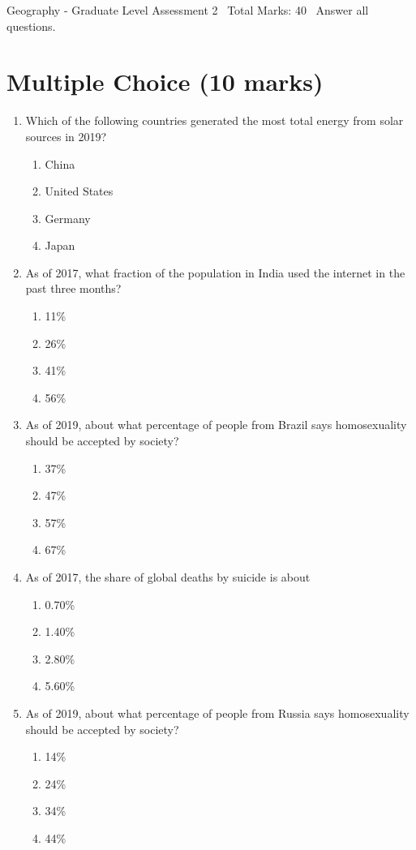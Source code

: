 \documentclass[12pt]{article}
\begin{document}
\begin{center}
Geography - Graduate Level Assessment 2 \
Total Marks: 40 \
Answer all questions.
\end{center}

\section*{Multiple Choice (10 marks)}
\begin{enumerate}[label=\arabic*.]
\item Which of the following countries generated the most total energy from solar sources in 2019?
\begin{enumerate}[label=(\alph*)]
    \item China
    \item United States
    \item Germany
    \item Japan
\end{enumerate}
\item As of 2017, what fraction of the population in India used the internet in the past three months?
\begin{enumerate}[label=(\alph*)]
    \item 11\%
    \item 26\%
    \item 41\%
    \item 56\%
\end{enumerate}
\item As of 2019, about what percentage of people from Brazil says homosexuality should be accepted by society?
\begin{enumerate}[label=(\alph*)]
    \item 37\%
    \item 47\%
    \item 57\%
    \item 67\%
\end{enumerate}
\item As of 2017, the share of global deaths by suicide is about
\begin{enumerate}[label=(\alph*)]
    \item 0.70\%
    \item 1.40\%
    \item 2.80\%
    \item 5.60\%
\end{enumerate}
\item As of 2019, about what percentage of people from Russia says homosexuality should be accepted by society?
\begin{enumerate}[label=(\alph*)]
    \item 14\%
    \item 24\%
    \item 34\%
    \item 44\%
\end{enumerate}
\end{enumerate}
\end{document}
